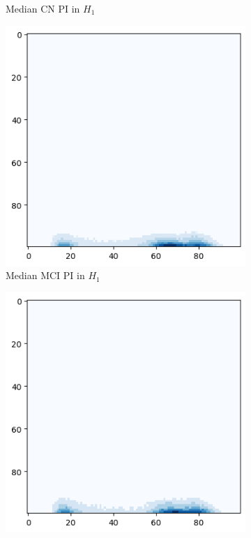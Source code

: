 \documentclass{article}
\begin{document}
\begin{figure}[htb]
\begin{subfigure}{0.32\textwidth}
    \caption{Median CN PI in $H_1$}
  \end{subfigure}
  \begin{subfigure}{0.32\textwidth}
    \includegraphics[width=\textwidth]{figures/median_pis/median_pi_MCI_h_1_rep.png}
    \caption{Median MCI PI in $H_1$}
  \end{subfigure}
  \begin{subfigure}{0.32\textwidth}
    \includegraphics[width=\textwidth]{figures/median_pis/median_pi_AD_h_1_rep.png}

\end{subfigure}
\end{figure}
\end{document}
